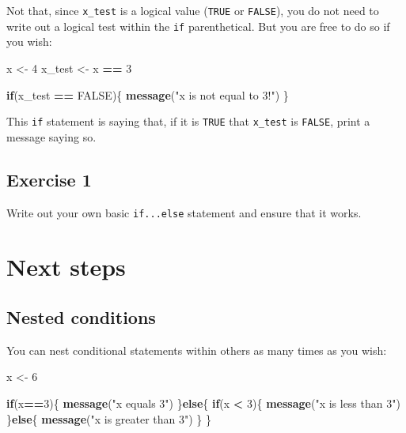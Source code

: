 \documentclass[
]{book}
\newenvironment{Shaded}{\begin{snugshade}}{\end{snugshade}}
\newcommand{\ControlFlowTok}[1]{\textcolor[rgb]{0.13,0.29,0.53}{\textbf{#1}}}
\newcommand{\DecValTok}[1]{\textcolor[rgb]{0.00,0.00,0.81}{#1}}
\newcommand{\KeywordTok}[1]{\textcolor[rgb]{0.13,0.29,0.53}{\textbf{#1}}}
\newcommand{\NormalTok}[1]{#1}
\newcommand{\OperatorTok}[1]{\textcolor[rgb]{0.81,0.36,0.00}{\textbf{#1}}}
\newcommand{\OtherTok}[1]{\textcolor[rgb]{0.56,0.35,0.01}{#1}}
\newcommand{\StringTok}[1]{\textcolor[rgb]{0.31,0.60,0.02}{#1}}
\begin{document}
Not that, since \texttt{x\_test} is a logical value (\texttt{TRUE} or \texttt{FALSE}), you do not need to write out a logical test within the \texttt{if} parenthetical. But you are free to do so if you wish:

\begin{Shaded}
\begin{Highlighting}[]
\NormalTok{x <-}\StringTok{ }\DecValTok{4}
\NormalTok{x_test <-}\StringTok{ }\NormalTok{x }\OperatorTok{==}\StringTok{ }\DecValTok{3}

\ControlFlowTok{if}\NormalTok{(x_test }\OperatorTok{==}\StringTok{ }\OtherTok{FALSE}\NormalTok{)\{}
  \KeywordTok{message}\NormalTok{(}\StringTok{"x is not equal to 3!"}\NormalTok{)}
\NormalTok{\}}
\end{Highlighting}
\end{Shaded}

This \texttt{if} statement is saying that, if it is \texttt{TRUE} that \texttt{x\_test} is \texttt{FALSE}, print a message saying so.

\hypertarget{exercise-1-7}{%
\subsection*{Exercise 1}\label{exercise-1-7}}

Write out your own basic \texttt{if...else} statement and ensure that it works.

\hypertarget{next-steps-1}{%
\section*{Next steps}\label{next-steps-1}}

\hypertarget{nested-conditions}{%
\subsection*{Nested conditions}\label{nested-conditions}}

You can nest conditional statements within others as many times as you wish:

\begin{Shaded}
\begin{Highlighting}[]
\NormalTok{x <-}\StringTok{ }\DecValTok{6}

\ControlFlowTok{if}\NormalTok{(x}\OperatorTok{==}\DecValTok{3}\NormalTok{)\{}
  \KeywordTok{message}\NormalTok{(}\StringTok{"x equals 3"}\NormalTok{)}
\NormalTok{\}}\ControlFlowTok{else}\NormalTok{\{}
  \ControlFlowTok{if}\NormalTok{(x }\OperatorTok{<}\StringTok{ }\DecValTok{3}\NormalTok{)\{}
    \KeywordTok{message}\NormalTok{(}\StringTok{"x is less than 3"}\NormalTok{)}
\NormalTok{  \}}\ControlFlowTok{else}\NormalTok{\{  }
    \KeywordTok{message}\NormalTok{(}\StringTok{"x is greater than 3"}\NormalTok{)}
\NormalTok{  \}}
\NormalTok{\}}
\end{Highlighting}
\end{Shaded}
\end{document}
